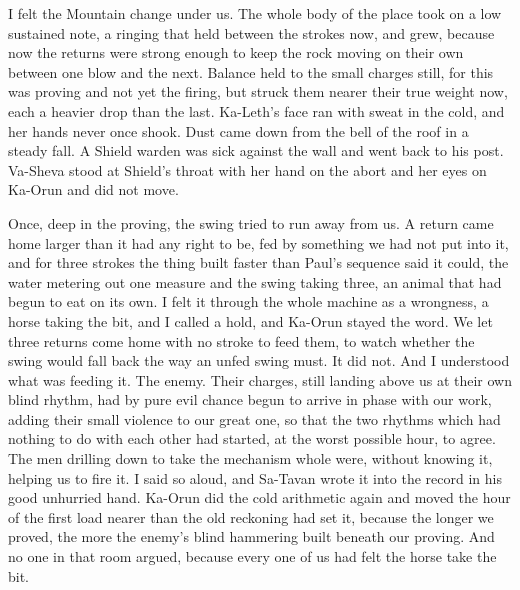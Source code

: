 I felt the Mountain change under us. The whole body of the place took on a low sustained note, a ringing that held between the strokes now, and grew, because now the returns were strong enough to keep the rock moving on their own between one blow and the next. Balance held to the small charges still, for this was proving and not yet the firing, but struck them nearer their true weight now, each a heavier drop than the last. Ka-Leth's face ran with sweat in the cold, and her hands never once shook. Dust came down from the bell of the roof in a steady fall. A Shield warden was sick against the wall and went back to his post. Va-Sheva stood at Shield's throat with her hand on the abort and her eyes on Ka-Orun and did not move.\par

Once, deep in the proving, the swing tried to run away from us. A return came home larger than it had any right to be, fed by something we had not put into it, and for three strokes the thing built faster than Paul's sequence said it could, the water metering out one measure and the swing taking three, an animal that had begun to eat on its own. I felt it through the whole machine as a wrongness, a horse taking the bit, and I called a hold, and Ka-Orun stayed the word. We let three returns come home with no stroke to feed them, to watch whether the swing would fall back the way an unfed swing must. It did not. And I understood what was feeding it. The enemy. Their charges, still landing above us at their own blind rhythm, had by pure evil chance begun to arrive in phase with our work, adding their small violence to our great one, so that the two rhythms which had nothing to do with each other had started, at the worst possible hour, to agree. The men drilling down to take the mechanism whole were, without knowing it, helping us to fire it. I said so aloud, and Sa-Tavan wrote it into the record in his good unhurried hand. Ka-Orun did the cold arithmetic again and moved the hour of the first load nearer than the old reckoning had set it, because the longer we proved, the more the enemy's blind hammering built beneath our proving. And no one in that room argued, because every one of us had felt the horse take the bit.\par

